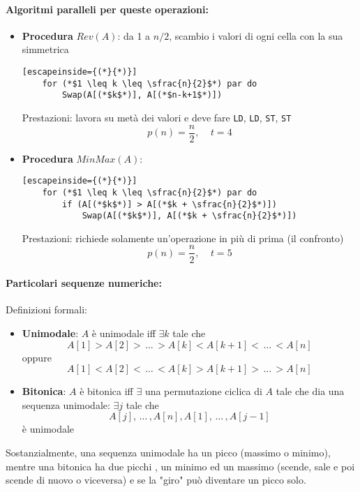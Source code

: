 \paragraph{Algoritmi paralleli per queste operazioni: }
\begin{itemize}
	\item \textbf{Procedura} $Rev(A)$: da 1 a $n/2$, scambio i valori di ogni cella con la sua simmetrica
	\begin{lstlisting}[escapeinside={(*}{*)}]
	for (*$1 \leq k \leq \sfrac{n}{2}$*) par do
		Swap(A[(*$k$*)], A[(*$n-k+1$*)])
	\end{lstlisting}
	Prestazioni: lavora su metà dei valori e deve fare \texttt{LD}, \texttt{LD}, \texttt{ST}, \texttt{ST}
	$$ p(n) = \frac{n}{2}, \;\;\;\; t = 4 $$
	
	\item \textbf{Procedura} $MinMax(A)$:
	\begin{lstlisting}[escapeinside={(*}{*)}]
	for (*$1 \leq k \leq \sfrac{n}{2}$*) par do
		if (A[(*$k$*)] > A[(*$k + \sfrac{n}{2}$*)])
			Swap(A[(*$k$*)], A[(*$k + \sfrac{n}{2}$*)])
	\end{lstlisting}
	Prestazioni: richiede solamente un'operazione in più di prima (il confronto)
	$$ p(n) = \frac{n}{2}, \;\;\;\; t = 5 $$
\end{itemize}

\paragraph{Particolari sequenze numeriche:} Definizioni formali: 
\begin{itemize}
	\item \textbf{Unimodale}: $A$ è unimodale iff $\exists k$ tale che 
	$$ A[1] > A[2] > \, \dots \, > A[k] < A[k+1] < \, \dots \, < A[n] $$
	oppure 
	$$ A[1] < A[2] < \, \dots \, < A[k] > A[k+1] > \, \dots \, > A[n] $$
	
	\item \textbf{Bitonica}: $A$ è bitonica iff $\exists$ una permutazione ciclica di $A$ tale che dia una sequenza unimodale: $\exists j$ tale che
	$$ A[j], \, \dots \, , A[n], A[1], \, \dots \, , A[j-1] $$ 
	è unimodale
\end{itemize}
Sostanzialmente, una sequenza unimodale ha un picco (massimo o minimo), mentre una bitonica ha due picchi , un minimo ed un massimo (scende, sale e poi scende di nuovo o viceversa) e se la "giro" può diventare un picco solo. \\

